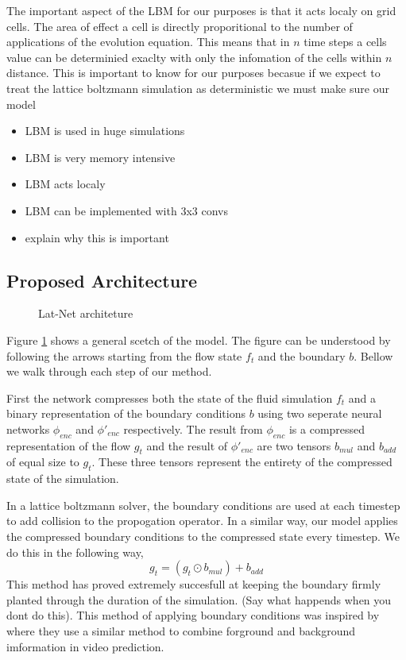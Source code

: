 \documentclass{article}
\begin{document}
The important aspect of the LBM for our purposes is that it acts localy on grid cells. The area of effect a cell is directly proporitional to the number of applications of the evolution equation. This means that in $n$ time steps a cells value can be determinied exaclty with only the infomation of the cells within $n$ distance. This is important to know for our purposes becasue if we expect to treat the lattice boltzmann simulation as deterministic we must make sure our model 

\begin{itemize}
  \item LBM is used in huge simulations
  \item LBM is very memory intensive
  \item LBM acts localy
  \item LBM can be implemented with 3x3 convs
  \item explain why this is important
\end{itemize}

\subsection{Proposed Architecture}

\begin{figure}[!t]
\centering
{}
\caption{Lat-Net architeture }
\label{fig_1}
\end{figure}

Figure \ref{fig_1} shows a general scetch of the model. The figure can be understood by following the arrows starting from the flow state $f_t$ and the boundary $b$. Bellow we walk through each step of our method.

First the network compresses both the state of the fluid simulation $f_t$ and a binary representation of the boundary conditions $b$ using two seperate neural networks $\phi_{enc}$ and $\phi'_{enc}$ respectively. The result from $\phi_{enc}$ is a compressed representation of the flow $g_t$ and the result of $\phi'_{enc}$ are two tensors $b_{mul}$ and $b_{add}$ of equal size to $g_t$. These three tensors represent the entirety of the compressed state of the simulation.

In a lattice boltzmann solver, the boundary conditions are used at each timestep to add collision to the propogation operator. In a similar way, our model applies the compressed boundary conditions to the compressed state every timestep. We do this in the following way,
\begin{equation}
  g_t = (g_t \odot b_{mul}) + b_{add}
\end{equation}
This method has proved extremely succesfull at keeping the boundary firmly planted through the duration of the simulation. (Say what happends when you dont do this). This method of applying boundary conditions was inspired by\cite{vondrick2016generating} where they use a similar method to combine forground and background imformation in video prediction.
\end{document}
